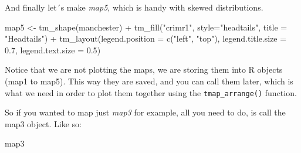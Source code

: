 \documentclass[
]{book}
\newenvironment{Shaded}{\begin{snugshade}}{\end{snugshade}}
\newcommand{\AttributeTok}[1]{\textcolor[rgb]{0.77,0.63,0.00}{#1}}
\newcommand{\FloatTok}[1]{\textcolor[rgb]{0.00,0.00,0.81}{#1}}
\newcommand{\FunctionTok}[1]{\textcolor[rgb]{0.00,0.00,0.00}{#1}}
\newcommand{\NormalTok}[1]{#1}
\newcommand{\OtherTok}[1]{\textcolor[rgb]{0.56,0.35,0.01}{#1}}
\newcommand{\SpecialCharTok}[1]{\textcolor[rgb]{0.00,0.00,0.00}{#1}}
\newcommand{\StringTok}[1]{\textcolor[rgb]{0.31,0.60,0.02}{#1}}
\begin{document}
And finally let´s make \emph{map5}, which is handy with skewed distributions.

\begin{Shaded}
\begin{Highlighting}[]
\NormalTok{map5 }\OtherTok{\textless{}{-}} \FunctionTok{tm\_shape}\NormalTok{(manchester) }\SpecialCharTok{+} 
  \FunctionTok{tm\_fill}\NormalTok{(}\StringTok{"crimr1"}\NormalTok{, }\AttributeTok{style=}\StringTok{"headtails"}\NormalTok{, }\AttributeTok{title =} \StringTok{"Headtails"}\NormalTok{) }\SpecialCharTok{+}
  \FunctionTok{tm\_layout}\NormalTok{(}\AttributeTok{legend.position =} \FunctionTok{c}\NormalTok{(}\StringTok{"left"}\NormalTok{, }\StringTok{"top"}\NormalTok{), }
            \AttributeTok{legend.title.size =} \FloatTok{0.7}\NormalTok{,}
            \AttributeTok{legend.text.size =} \FloatTok{0.5}\NormalTok{)}
\end{Highlighting}
\end{Shaded}

Notice that we are not plotting the maps, we are storing them into R objects (map1 to map5). This way they are saved, and you can call them later, which is what we need in order to plot them together using the \texttt{tmap\_arrange()} function.

So if you wanted to map just \emph{map3} for example, all you need to do, is call the map3 object. Like so:

\begin{Shaded}
\begin{Highlighting}[]
\NormalTok{map3}
\end{Highlighting}
\end{Shaded}
\end{document}
